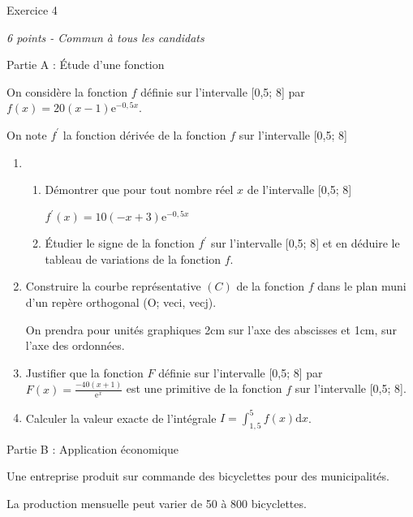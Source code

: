 
%
\begin{h2}Exercice 4\end{h2}
\textit{6 points - Commun à tous les candidats}
\par
\begin{h3}Partie A : Étude d'une fonction\end{h3}
On considère la fonction $f$ définie sur l'intervalle [0,5; 8] par $f\left(x\right) = 20\left(x-1\right)\text{e}^{-0,5x}$.
\par
On note $f^{\prime}$ la fonction dérivée de la fonction $f$ sur l'intervalle [0,5; 8]
\begin{enumerate}
     \item
     \begin{enumerate}
          \item
          Démontrer que pour tout nombre réel $x$ de l'intervalle [0,5; 8]
          \par
          $f^{\prime}\left(x\right) = 10\left(- x + 3\right)\text{e}^{-0,5x}$
          \item
          Étudier le signe de la fonction $f^{\prime}$ sur l'intervalle [0,5; 8] et en déduire le tableau de variations de la fonction $f$.
     \end{enumerate}
     \item
     Construire la courbe représentative $\left(C\right)$ de la fonction $f$ dans le plan muni d'un repère orthogonal (O; veci, vecj).
     \par
     On prendra pour unités graphiques 2cm sur l'axe des abscisses et 1cm, sur l'axe des ordonnées.
     \item
     Justifier que la fonction $F$ définie sur l'intervalle  [0,5; 8] par $F\left(x\right) = \frac{-40\left(x + 1\right)}{\text{e}^{x}}$ est une primitive de la fonction $f$ sur l'intervalle [0,5; 8].
     \item
     Calculer la valeur exacte de l'intégrale  $I  = \int_{1,5}^{5} f\left(x\right) \text{d}x$.
\end{enumerate}
\begin{h3}Partie B : Application économique\end{h3}
Une entreprise produit sur commande des bicyclettes pour des municipalités.
\par
La production mensuelle peut varier de 50 à 800 bicyclettes.
